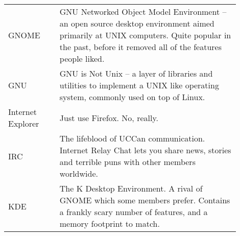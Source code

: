 {\begin{tabular}{p{0.2\linewidth}|p{0.7\linewidth}}
GNOME &
GNU Networked Object Model Environment -- an open source desktop environment aimed primarily at UNIX computers. Quite popular in the past, before it removed all of the features people liked. \\
GNU &
GNU is Not Unix -- a layer of libraries and utilities to implement a UNIX like operating system, commonly used on top of Linux. \\
Internet Explorer &
Just use Firefox. No, really. \\
IRC &
The lifeblood of UCCan communication. Internet Relay Chat lets you share news, stories and terrible puns with other members worldwide. \\
KDE &
The K Desktop Environment. A rival of GNOME which some members prefer. Contains a frankly scary number of features, and a memory footprint to match. \\
\end{tabular}

}
